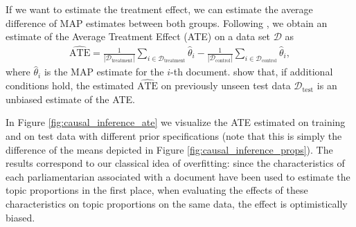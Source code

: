 If we want to estimate the treatment effect, we can estimate the average difference of MAP estimates between both groups. Following \cite{egami2018make}, we obtain an estimate of the Average Treatment Effect (ATE) on a data set $\mathcal{D}$ as 
\begin{align}
\widehat{\text{ATE}} = \frac{1}{|\mathcal{D}_{\text{treatment}}|}\sum_{i \in \mathcal{D}_{\text{treatment}}} \hat{\theta}_i - \frac{1}{|\mathcal{D}_{\text{control}}|}\sum_{i \in \mathcal{D}_{\text{control}}} \hat{\theta}_i,
\end{align} 
where $\hat{\theta}_i$ is the MAP estimate for the $i$-th document. \cite{egami2018make} show that, if additional conditions hold, the estimated $\widehat{\text{ATE}}$ on previously unseen test data $\mathcal{D}_{\text{test}}$ is an unbiased estimate of the ATE.

In Figure \ref{fig:causal_inference_ate} we visualize the ATE estimated on training and on test data with different prior specifications (note that this is simply the difference of the means depicted in Figure \ref{fig:causal_inference_props}). The results correspond to our classical idea of overfitting: since the characteristics of each parliamentarian associated with a document have been used to estimate the topic proportions in the first place, when evaluating the effects of these characteristics on topic proportions on the same data, the effect is optimistically biased.

